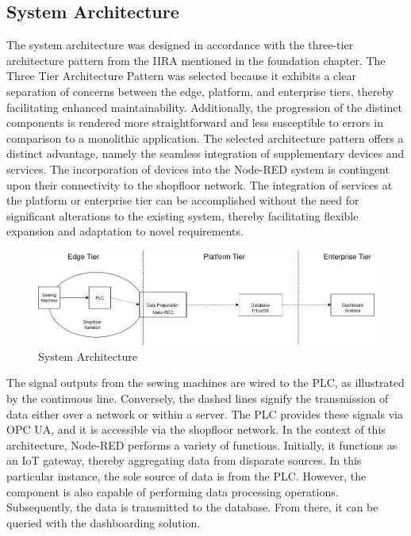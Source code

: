 {\subsection{System Architecture}
The system architecture was designed in accordance with the three-tier architecture pattern from the IIRA mentioned in the foundation chapter. The Three Tier Architecture Pattern was selected because it exhibits a clear separation of concerns between the edge, platform, and enterprise tiers, thereby facilitating enhanced maintainability. Additionally, the progression of the distinct components is rendered more straightforward and less susceptible to errors in comparison to a monolithic application. The selected architecture pattern offers a distinct advantage, namely the seamless integration of supplementary devices and services. The incorporation of devices into the Node-RED system is contingent upon their connectivity to the shopfloor network. The integration of services at the platform or enterprise tier can be accomplished without the need for significant alterations to the existing system, thereby facilitating flexible expansion and adaptation to novel requirements.
\begin{figure}[H]
	\includegraphics[width=\linewidth]{pic/system_overview.png}
	\caption{System Architecture}
	\label{fig:Model-Component-Pattern}
\end{figure}
The signal outputs from the sewing machines are wired to the PLC, as illustrated by the continuous line. Conversely, the dashed lines signify the transmission of data either over a network or within a server. The PLC provides these signals via OPC UA, and it is accessible via the shopfloor network. In the context of this architecture, Node-RED performs a variety of functions. Initially, it functions as an IoT gateway, thereby aggregating data from disparate sources. In this particular instance, the sole source of data is from the PLC. However, the component is also capable of performing data processing operations.  Subsequently, the data is transmitted to the database. From there, it can be queried with the dashboarding solution. 


}
